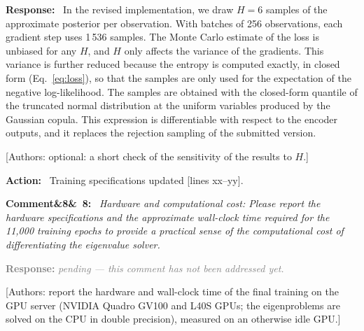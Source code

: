 \documentclass[11pt]{article}
\newenvironment{rcomment}[1]{\par\bigskip\noindent\textbf{Comment\ifx&#1&\else\ #1\fi:}\ \itshape}{\par}
\newenvironment{response}{\par\smallskip\noindent\color{resp}\textbf{Response:}\ }{\par}
\newenvironment{action}{\par\smallskip\noindent\color{resp}\textbf{Action:}\ }{\par}
\newcommand{\pending}{\par\smallskip\noindent\textcolor{gray}{\textbf{Response:} \textit{pending --- this comment
has not been addressed yet.}}\par}
\newcommand{\authornote}[1]{\textcolor{note}{\textsf{[Authors: #1]}}}
\newcommand{\tbd}[1]{\textcolor{note}{\textsf{[#1]}}}
\newcommand{\lines}[1]{\tbd{lines #1}}
\begin{document}
\begin{response}
In the revised implementation, we draw $H=6$ samples of the approximate posterior per observation. With batches of 256
observations, each gradient step uses 1\,536 samples. The Monte Carlo estimate of the loss is unbiased for any $H$, and
$H$ only affects the variance of the gradients. This variance is further reduced because the entropy is computed
exactly, in closed form (Eq.~\eqref{eq:loss}), so that the samples are only used for the expectation of the negative
log-likelihood. The samples are obtained with the closed-form quantile of the truncated normal distribution at the uniform
variables produced by the Gaussian copula. This expression is differentiable with respect to the encoder outputs, and it
replaces the rejection sampling of the submitted version.
\end{response}
\authornote{optional: a short check of the sensitivity of the results to $H$.}

\begin{action}
Training specifications updated \lines{xx--yy}.
\end{action}

\begin{rcomment}{8}
Hardware and computational cost: Please report the hardware specifications and the approximate wall-clock time
required for the 11,000 training epochs to provide a practical sense of the computational cost of differentiating the
eigenvalue solver.
\end{rcomment}
\pending
\authornote{report the hardware and wall-clock time of the final training on the GPU server (NVIDIA Quadro GV100 and L40S GPUs; the eigenproblems are solved on the CPU in double precision), measured on an otherwise idle GPU.}

\end{document}
